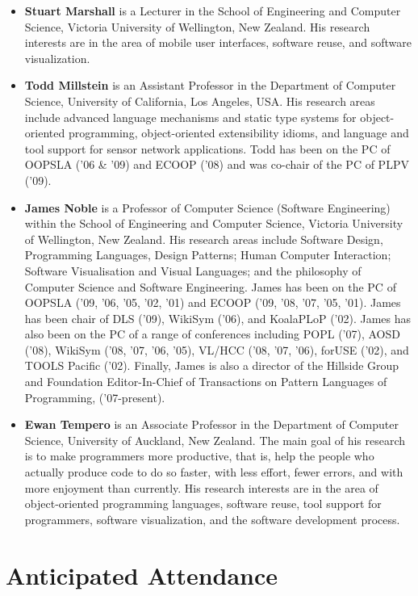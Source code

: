 \documentclass{acm_proc_article-sp}
\begin{document}
\begin{itemize}
\item \textbf{Stuart Marshall} is a Lecturer in the School of Engineering and Computer Science, Victoria University of Wellington, New Zealand. His research interests are in the area of mobile user interfaces, software reuse, and software visualization.

\item \textbf{Todd Millstein} is an Assistant Professor in the Department of Computer Science, University of California, Los Angeles, USA. His research areas include advanced language mechanisms and static type systems for object-oriented programming, object-oriented extensibility idioms, and language and tool support for sensor network applications. Todd has been on the PC of OOPSLA ('06 & '09) and ECOOP ('08) and was co-chair of the PC of PLPV ('09).

\item \textbf{James Noble} is a Professor of Computer Science (Software Engineering) within the School of 
Engineering and Computer Science, Victoria University of Wellington, New Zealand. 
His research areas include Software Design, Programming Languages, Design Patterns; 
Human Computer Interaction; Software Visualisation and Visual Languages; and the philosophy of Computer Science and Software Engineering. James has been on the PC of OOPSLA ('09, '06, '05, '02, '01) and ECOOP ('09, '08, '07, '05, '01). James has been chair of DLS ('09), WikiSym ('06), and KoalaPLoP ('02). James has also been on the PC of a range of conferences including POPL ('07), AOSD ('08), WikiSym ('08, '07, '06, '05), VL/HCC ('08, '07, '06), forUSE ('02), and TOOLS Pacific ('02). Finally, James is also a director of the Hillside Group and Foundation Editor-In-Chief of Transactions on Pattern Languages of Programming, ('07-present).

\item \textbf{Ewan Tempero} is an Associate Professor in the Department of Computer Science, University of Auckland, New Zealand. The main goal of his research is to make programmers more productive, that is, help the people who actually produce code to do so faster, with less effort, fewer errors, and with more enjoyment than currently. His research interests are in the area of object-oriented programming languages, software reuse, tool support for programmers, software visualization, and the software development process.

\end{itemize}

\section{Anticipated Attendance}
\end{document}
